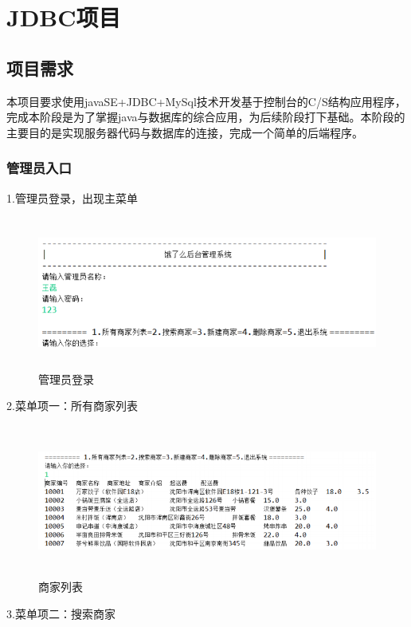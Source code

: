 
\chapter{JDBC项目}
\section{项目需求}
本项目要求使用javaSE+JDBC+MySql技术开发基于控制台的C/S结构应用程序，完成本阶段是为了掌握java与数据库的综合应用，为后续阶段打下基础。本阶段的主要目的是实现服务器代码与数据库的连接，完成一个简单的后端程序。~\\

\subsection{管理员入口}
1.管理员登录，出现主菜单

\begin{figure}[H]
    \centering
    \includegraphics[width=12cm,height=5cm]{figures/jdbc1.png}
    \caption{管理员登录}
\end{figure}


2.菜单项一：所有商家列表

\begin{figure}[H]
    \centering
    \includegraphics[width=15cm,height=5cm]{figures/jdbc2.png}
    \caption{商家列表}
\end{figure}

3.菜单项二：搜索商家

